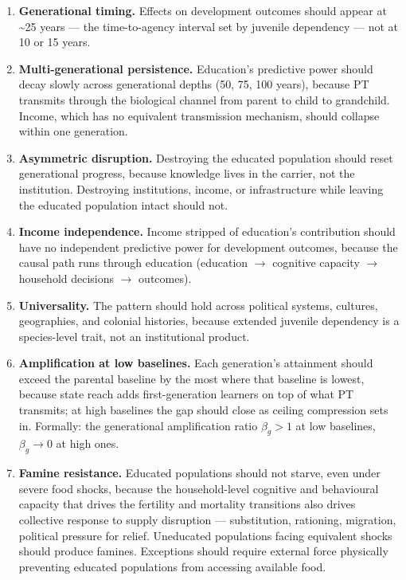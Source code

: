 \documentclass[12pt,letterpaper]{article}
\begin{document}
\begin{enumerate}
\item \textbf{Generational timing.} Effects on development outcomes should appear at \textasciitilde25 years --- the time-to-agency interval set by juvenile dependency --- not at 10 or 15 years.\label{pred:timing}

\item \textbf{Multi-generational persistence.} Education's predictive power should decay slowly across generational depths (50, 75, 100 years), because PT transmits through the biological channel from parent to child to grandchild. Income, which has no equivalent transmission mechanism, should collapse within one generation.\label{pred:persistence}

\item \textbf{Asymmetric disruption.} Destroying the educated population should reset generational progress, because knowledge lives in the carrier, not the institution. Destroying institutions, income, or infrastructure while leaving the educated population intact should not.\label{pred:disruption}

\item \textbf{Income independence.} Income stripped of education's contribution should have no independent predictive power for development outcomes, because the causal path runs through education (education $\to$ cognitive capacity $\to$ household decisions $\to$ outcomes).\label{pred:income}

\item \textbf{Universality.} The pattern should hold across political systems, cultures, geographies, and colonial histories, because extended juvenile dependency is a species-level trait, not an institutional product.\label{pred:universality}

\item \textbf{Amplification at low baselines.} Each generation's attainment should exceed the parental baseline by the most where that baseline is lowest, because state reach adds first-generation learners on top of what PT transmits; at high baselines the gap should close as ceiling compression sets in. Formally: the generational amplification ratio $\beta_g > 1$ at low baselines, $\beta_g \to 0$ at high ones.\label{pred:amplification}

\item \textbf{Famine resistance.} Educated populations should not starve, even under severe food shocks, because the household-level cognitive and behavioural capacity that drives the fertility and mortality transitions also drives collective response to supply disruption --- substitution, rationing, migration, political pressure for relief. Uneducated populations facing equivalent shocks should produce famines. Exceptions should require external force physically preventing educated populations from accessing available food.\label{pred:famine}
\end{enumerate}
\end{document}
